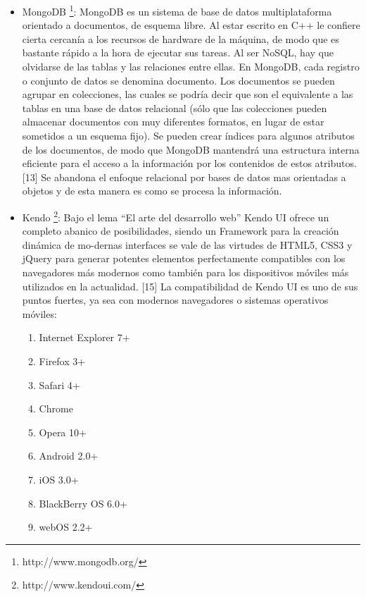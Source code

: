 \begin{itemize}
 \item MongoDB \footnote{http://www.mongodb.org/}: MongoDB es un sistema de base de datos multiplataforma orientado a documentos, 
 de esquema libre. Al estar escrito en C++ le confiere cierta cercanía a los recursos de hardware de la máquina, de 
 modo que es bastante rápido a la hora de ejecutar sus tareas. 
 Al ser NoSQL, hay que olvidarse de las tablas y las relaciones entre ellas.
 En MongoDB, cada registro o conjunto de datos se denomina documento. Los documentos se pueden agrupar en colecciones, las cuales se 
 podría decir que son el equivalente a las tablas en una base de datos relacional (sólo que las colecciones pueden almacenar 
 documentos con muy diferentes formatos, en lugar de estar sometidos a un esquema fijo). Se pueden crear índices para algunos 
 atributos de los documentos, de modo que MongoDB mantendrá una estructura interna eficiente para el acceso a la información por 
 los contenidos de estos atributos. [13] 
 Se abandona el enfoque relacional por bases de datos mas orientadas a objetos y de esta manera es como se procesa la información.
 
 \item Kendo \footnote{http://www.kendoui.com/}: Bajo el lema “El arte del desarrollo web” Kendo UI ofrece un completo abanico 
 de posibilidades, siendo un Framework para la creación dinámica de mo-dernas interfaces se vale de las virtudes de HTML5, CSS3 
 y jQuery para generar potentes elementos perfectamente compatibles con los navegadores más modernos como también para los 
 dispositivos móviles más utilizados en la actualidad. [15]
 La compatibilidad de Kendo UI es uno de sus puntos fuertes, ya sea con modernos navegadores o sistemas operativos móviles:
 \begin{enumerate}
  \item Internet Explorer 7+
  \item Firefox 3+
  \item Safari 4+
  \item Chrome
  \item Opera 10+
  \item Android 2.0+
  \item iOS 3.0+
  \item BlackBerry OS 6.0+
  \item webOS 2.2+
 \end{enumerate}

 
\end{itemize}



